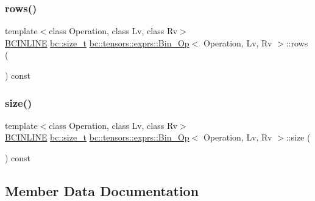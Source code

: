 \mbox{\label{structbc_1_1tensors_1_1exprs_1_1Bin__Op_a64a12bb5bea6788976aa13eb55dbde67}} 
\subsubsection{\texorpdfstring{rows()}{rows()}}
{\footnotesize\ttfamily template$<$class Operation, class Lv, class Rv$>$ \\
\hyperlink{common_8h_a6699e8b0449da5c0fafb878e59c1d4b1}{B\+C\+I\+N\+L\+I\+NE} \hyperlink{namespacebc_aaf8e3fbf99b04b1b57c4f80c6f55d3c5}{bc\+::size\+\_\+t} \hyperlink{structbc_1_1tensors_1_1exprs_1_1Bin__Op}{bc\+::tensors\+::exprs\+::\+Bin\+\_\+\+Op}$<$ Operation, Lv, Rv $>$\+::rows (\begin{DoxyParamCaption}{ }\end{DoxyParamCaption}) const\hspace{0.3cm}{\ttfamily [inline]}}

\mbox{\label{structbc_1_1tensors_1_1exprs_1_1Bin__Op_a78c087617de82b25b275e80d4171d096}} 
\subsubsection{\texorpdfstring{size()}{size()}}
{\footnotesize\ttfamily template$<$class Operation, class Lv, class Rv$>$ \\
\hyperlink{common_8h_a6699e8b0449da5c0fafb878e59c1d4b1}{B\+C\+I\+N\+L\+I\+NE} \hyperlink{namespacebc_aaf8e3fbf99b04b1b57c4f80c6f55d3c5}{bc\+::size\+\_\+t} \hyperlink{structbc_1_1tensors_1_1exprs_1_1Bin__Op}{bc\+::tensors\+::exprs\+::\+Bin\+\_\+\+Op}$<$ Operation, Lv, Rv $>$\+::size (\begin{DoxyParamCaption}{ }\end{DoxyParamCaption}) const\hspace{0.3cm}{\ttfamily [inline]}}



\subsection{Member Data Documentation}
\mbox{\label{structbc_1_1tensors_1_1exprs_1_1Bin__Op_a0fcb386ccdf770056af498257790126a}} 
